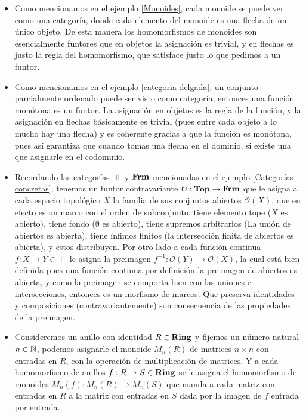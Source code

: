 \documentclass{comunicaciones}
\begin{document}
\begin{ej}
    \begin{itemize}
        \item Como mencionamos en el ejemplo \ref{Monoides}, cada monoide se puede ver como una categoría, donde cada elemento del monoide es una flecha de un
        único objeto. De esta manera los homomorfismos de monoides son esencialmente funtores que en objetos la asignación es trivial, y en flechas es justo la 
        regla del homomorfismo, que satisface justo lo que pedimos a un funtor.
        \item Como mencionamos en el ejemplo \ref{categoria delgada}, un conjunto parcialmente ordenado puede ser visto como categoría, entonces una función
        monótona es un funtor. La asignación en objetos es la regla de la función, y la asignación en flechas básicamente es trivial (pues entre cada objeto a lo
        mucho hay una flecha) y es coherente gracias a que la función es monótona, pues así garantiza que cuando tomas una flecha en el dominio, si existe una
        que asignarle en el codominio.
    \end{itemize}
\end{ej}

\begin{ej}\label{Funtor de abiertos}
    \begin{itemize}
        \item Recordando las categorías $\Top$ y $\mathbf{Frm}$ mencionadas en el ejemplo \ref{Categorías concretas}, tenemos un funtor contravariante $\mathcal O:\mathbf{Top}\to\mathbf{Frm}$ que 
        le asigna a cada espacio topológico $X$ la familia de sus conjuntos abiertos $\mathcal O(X)$, que en efecto es un marco con el orden de subconjunto, tiene 
        elemento tope ($X$ es abierto), tiene fondo ($\emptyset$ es abierto), tiene supremos arbitrarios (La unión de abiertos es abierta), tiene ínfimos finitos
        (la intersección finita de abiertos es abierta), y estos distribuyen. Por otro lado a cada función continua $f:X\to Y\in\Top$ le asigna la preimagen
        $f^{-1}:\mathcal O(Y)\to\mathcal O(X)$, la cual está bien definida pues una función continua por definición la preimagen de abiertos es abierta, y como la preimagen
        se comporta bien con las uniones e intersecciones, entonces es un morfismo de marcos. Que preserva identidades y composiciones (contravariantemente) son
        consecuencia de las propiedades de la preimagen.
        \item Consideremos un anillo con identidad $R\in\mathbf{Ring}$ y fijemos un número natural $n\in\mathbb N$, podemos asignarle el monoide $M_n(R)$ de matrices $n\times n$ 
        con entradas en $R$, con la operación de multiplicación de matrices. Y a cada homomorfismo de anillos $f:R\to S\in\mathbf{Ring}$ se le asigna el homomorfismo 
        de monoides $M_n(f):M_n(R)\to M_n(S)$ que manda a cada matriz con entradas en $R$ a la matriz con entradas en $S$ dada por la imagen de $f$ entrada 
        por entrada.
    \end{itemize}
\end{ej}
\end{document}

